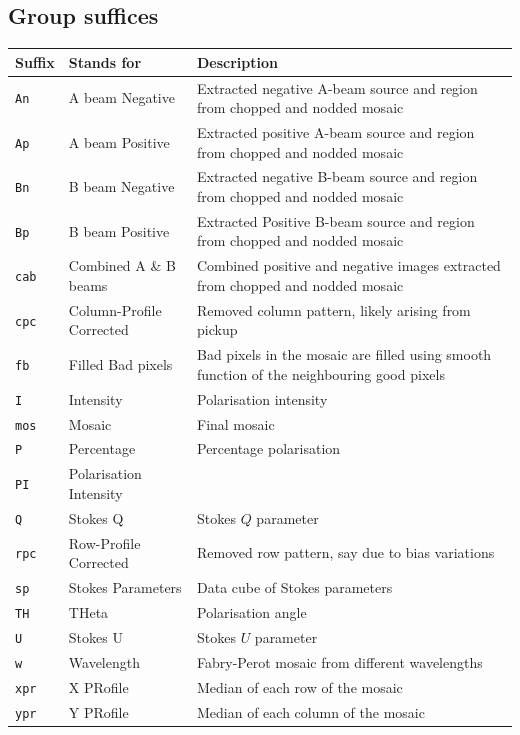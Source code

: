 \documentclass[twoside,11pt]{article}
\renewcommand{\_}{\texttt{\symbol{95}}}
\begin{document}
\subsection*{Group suffices}%
\begin{tabular}{llp{80mm}}
\hline
  Suffix   & Stands for             & Description \\ \hline
{\tt\_An}  & A beam Negative        & Extracted negative A-beam source and
                                      region from chopped and nodded mosaic \\
{\tt\_Ap}  & A beam Positive        & Extracted positive A-beam source and 
                                      region from chopped and nodded mosaic \\
{\tt\_Bn}  & B beam Negative        & Extracted negative B-beam source and
                                      region from chopped and nodded mosaic \\
{\tt\_Bp}  & B beam Positive        & Extracted Positive B-beam source and 
                                      region from chopped and nodded mosaic \\
{\tt\_cab} & Combined A \& B beams  & Combined positive and negative images
                                      extracted from chopped and nodded mosaic \\
{\tt\_cpc} & Column-Profile Corrected  & Removed column pattern, likely arising
                                      from pickup \\
{\tt\_fb}  & Filled Bad pixels      & Bad pixels in the mosaic are filled using
                                      smooth function of the neighbouring good
                                      pixels \\
{\tt\_I}   & Intensity              & Polarisation intensity \\
{\tt\_mos} & Mosaic                 & Final mosaic \\
{\tt\_P}   & Percentage             & Percentage polarisation \\
{\tt\_PI}  & Polarisation Intensity & \\
{\tt\_Q}   & Stokes Q               & Stokes $Q$ parameter \\
{\tt\_rpc} & Row-Profile Corrected  & Removed row pattern, say due to bias
                                      variations \\
{\tt\_sp}  & Stokes Parameters      & Data cube of Stokes parameters \\
{\tt\_TH}  & THeta                  & Polarisation angle \\
{\tt\_U}   & Stokes U               & Stokes $U$ parameter \\
{\tt\_w}   & Wavelength             & Fabry-Perot mosaic from different
                                      wavelengths \\
{\tt\_xpr} & X PRofile              & Median of each row of the mosaic \\
{\tt\_ypr} & Y PRofile              & Median of each column of the mosaic \\
\end{tabular}
\end{document}
